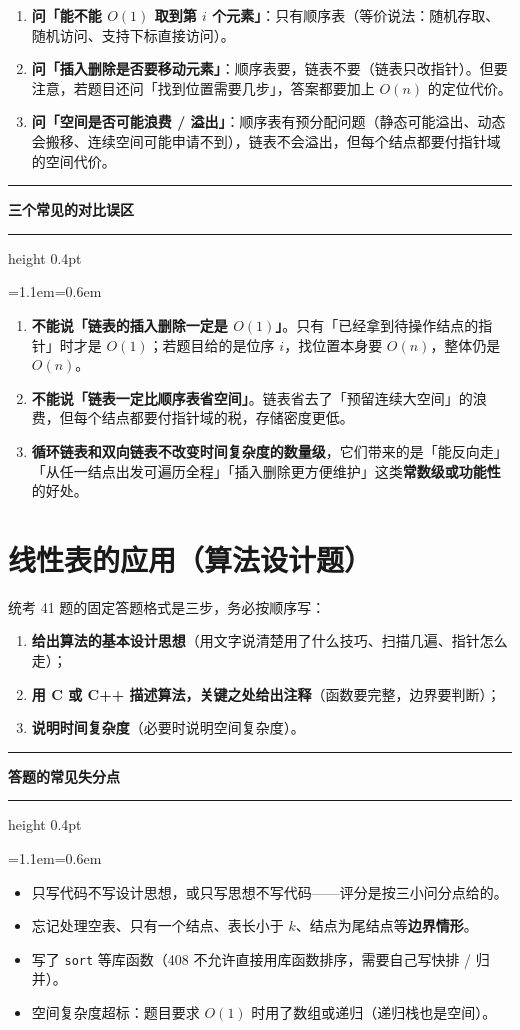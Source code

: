 \documentclass[11pt,openany,UTF8]{ctexbook}
\newcommand{\callouthead}[2]{%
  \par\addvspace{7pt}\noindent
  {\color{#1}\rule[-0.15em]{3pt}{1.05em}}\hspace{0.5em}%
  {\bfseries\color{#1}#2}\par\nobreak\vspace{-0.35em}%
  {\color{rulesep}\hrule height 0.4pt}\nobreak\vspace{0.45em}%
  \begingroup\small\setlength{\parindent}{0pt}%
  \leftskip=1.1em\rightskip=0.6em\noindent\ignorespaces}
\newcommand{\calloutend}{\par\endgroup\addvspace{7pt}}
\newenvironment{callwarn}[1]{\callouthead{warnbar}{#1}}{\calloutend}
\begin{document}
\begin{enumerate}
\item \textbf{问「能不能 $O(1)$ 取到第 $i$ 个元素」}：只有顺序表（等价说法：随机存取、随机访问、支持下标直接访问）。
\item \textbf{问「插入删除是否要移动元素」}：顺序表要，链表不要（链表只改指针）。但要注意，若题目还问「找到位置需要几步」，答案都要加上 $O(n)$ 的定位代价。
\item \textbf{问「空间是否可能浪费 / 溢出」}：顺序表有预分配问题（静态可能溢出、动态会搬移、连续空间可能申请不到），链表不会溢出，但每个结点都要付指针域的空间代价。
\end{enumerate}
\begin{callwarn}{三个常见的对比误区}
\begin{enumerate}
\item \textbf{不能说「链表的插入删除一定是 $O(1)$」}。只有「已经拿到待操作结点的指针」时才是 $O(1)$；若题目给的是位序 $i$，找位置本身要 $O(n)$，整体仍是 $O(n)$。
\item \textbf{不能说「链表一定比顺序表省空间」}。链表省去了「预留连续大空间」的浪费，但每个结点都要付指针域的税，存储密度更低。
\item \textbf{循环链表和双向链表不改变时间复杂度的数量级}，它们带来的是「能反向走」「从任一结点出发可遍历全程」「插入删除更方便维护」这类\textbf{常数级或功能性}的好处。
\end{enumerate}
\end{callwarn}

\section{线性表的应用（算法设计题）}

统考 41 题的固定答题格式是三步，务必按顺序写：

\begin{enumerate}
\item \textbf{给出算法的基本设计思想}（用文字说清楚用了什么技巧、扫描几遍、指针怎么走）；
\item \textbf{用 C 或 C++ 描述算法，关键之处给出注释}（函数要完整，边界要判断）；
\item \textbf{说明时间复杂度}（必要时说明空间复杂度）。
\end{enumerate}
\begin{callwarn}{答题的常见失分点}
\begin{itemize}
\item 只写代码不写设计思想，或只写思想不写代码——评分是按三小问分点给的。
\item 忘记处理空表、只有一个结点、表长小于 $k$、结点为尾结点等\textbf{边界情形}。
\item 写了 \texttt{sort} 等库函数（408 不允许直接用库函数排序，需要自己写快排 / 归并）。
\item 空间复杂度超标：题目要求 $O(1)$ 时用了数组或递归（递归栈也是空间）。
\end{itemize}
\end{callwarn}
\end{document}
